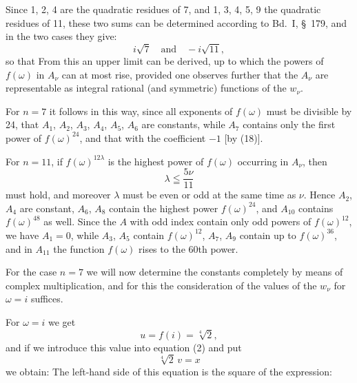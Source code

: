 
Since 1, 2, 4 are the quadratic residues of 7, and 1, 3, 4, 5, 9 the
quadratic residues of 11, these two sums can be determined according to
Bd.~I, \S\ 179, and in the two cases they give:
\[
i\sqrt{7} \quad \text{and} \quad -i\sqrt{11},
\]
so that
From this an upper limit can be derived, up to which the powers of
$f(\omega)$ in $A_\nu$ can at most rise, provided one observes further
that the $A_\nu$ are representable as integral rational (and
symmetric) functions of the $w_\nu$.

For $n=7$ it follows in this way, since all exponents of $f(\omega)$
must be divisible by 24, that $A_1$, $A_2$, $A_3$, $A_4$, $A_5$, $A_6$
are constants, while $A_7$ contains only the first power of
$f(\omega)^{24}$, and that with the coefficient $-1$ [by (18)].

For $n=11$, if $f(\omega)^{12\lambda}$ is the highest power of
$f(\omega)$ occurring in $A_\nu$, then
\[
\lambda \leqq \frac{5\nu}{11}
\]
must hold, and moreover $\lambda$ must be even or odd at the same time
as $\nu$. Hence $A_2$, $A_4$ are constant, $A_6$, $A_8$ contain the
highest power $f(\omega)^{24}$, and $A_{10}$ contains $f(\omega)^{48}$
as well. Since the $A$ with odd index contain only odd powers of
$f(\omega)^{12}$, we have $A_1 = 0$, while $A_3$, $A_5$ contain
$f(\omega)^{12}$, $A_7$, $A_9$ contain up to $f(\omega)^{36}$, and in
$A_{11}$ the function $f(\omega)$ rises to the 60th power.

For the case $n=7$ we will now determine the constants completely by
means of complex multiplication, and for this the consideration of the
values of the $w_\nu$ for $\omega = i$ suffices.

For $\omega = i$ we get
\[
u = f(i) = \sqrt[4]{2},
\]
and if we introduce this value into equation (2) and put
\[
\sqrt[4]{2}\, v = x
\]
we obtain:
The left-hand side of this equation is the square of the expression:
